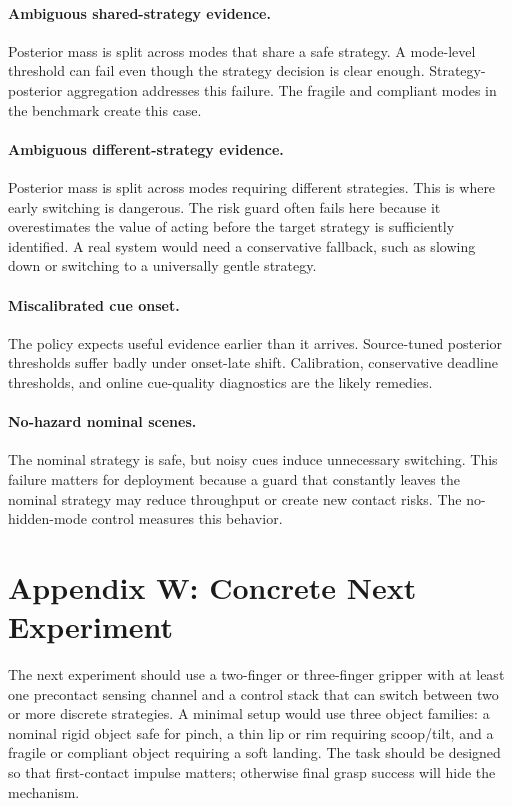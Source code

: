 \documentclass{article}
\begin{document}
\paragraph{Ambiguous shared-strategy evidence.}
Posterior mass is split across modes that share a safe strategy. A mode-level threshold can fail even though the strategy decision is clear enough. Strategy-posterior aggregation addresses this failure. The fragile and compliant modes in the benchmark create this case.

\paragraph{Ambiguous different-strategy evidence.}
Posterior mass is split across modes requiring different strategies. This is where early switching is dangerous. The risk guard often fails here because it overestimates the value of acting before the target strategy is sufficiently identified. A real system would need a conservative fallback, such as slowing down or switching to a universally gentle strategy.

\paragraph{Miscalibrated cue onset.}
The policy expects useful evidence earlier than it arrives. Source-tuned posterior thresholds suffer badly under onset-late shift. Calibration, conservative deadline thresholds, and online cue-quality diagnostics are the likely remedies.

\paragraph{No-hazard nominal scenes.}
The nominal strategy is safe, but noisy cues induce unnecessary switching. This failure matters for deployment because a guard that constantly leaves the nominal strategy may reduce throughput or create new contact risks. The no-hidden-mode control measures this behavior.

\section{Appendix W: Concrete Next Experiment}

The next experiment should use a two-finger or three-finger gripper with at least one precontact sensing channel and a control stack that can switch between two or more discrete strategies. A minimal setup would use three object families: a nominal rigid object safe for pinch, a thin lip or rim requiring scoop/tilt, and a fragile or compliant object requiring a soft landing. The task should be designed so that first-contact impulse matters; otherwise final grasp success will hide the mechanism.
\end{document}
